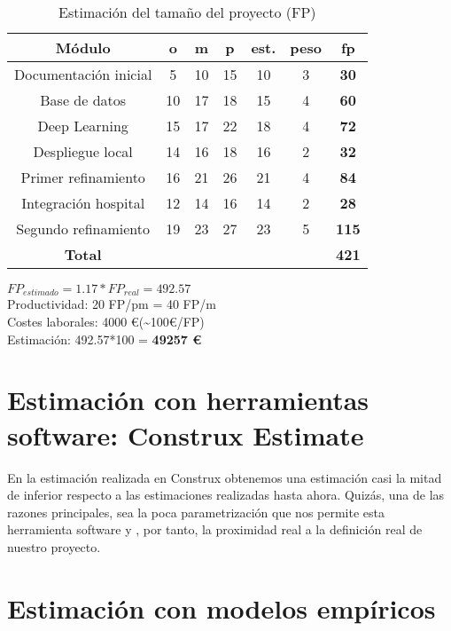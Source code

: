 \begin{table}[H]
	\begin{center}
		\begin{tabular}{|c||c|c|c|c|c|c|}
			\hline 
			Módulo & o & m & p & est. & peso & \textbf{fp} \\
			\hline \hline
			Documentación inicial & 5 & 10 & 15 & 10 & 3 & \textbf{30}  \\ \hline
			Base de datos & 10 & 17 & 18 & 15 & 4 & \textbf{60}  \\ \hline
			Deep Learning & 15 & 17 & 22 & 18 & 4 & \textbf{72}  \\ \hline
			Despliegue local & 14 & 16 & 18 & 16 & 2 & \textbf{32}  \\ \hline
			Primer refinamiento & 16 & 21 & 26 & 21 & 4 & \textbf{84}  \\ \hline
			Integración hospital & 12 & 14 & 16 & 14 & 2 & \textbf{28}  \\ \hline
			Segundo refinamiento & 19 & 23 & 27 & 23 & 5 & \textbf{115}  \\ \hline
			\textbf{Total} & & & & & & \textbf{421}  \\ \hline
		\end{tabular}
		\caption{Estimación del tamaño del proyecto (FP)}
		\label{tabla:FP}
	\end{center}
\end{table}


$FP_{estimado} = 1.17 * FP_{real} = 492.57$ \\
Productividad: 20 FP/pm = 40 FP/m \\
Costes laborales: 4000 \euro (\textasciitilde{}100\euro/FP) \\
Estimación: 492.57*100 = \textbf{49257 \euro} 

\section{Estimación con herramientas software: Construx Estimate}


En la estimación realizada en Construx obtenemos una estimación casi la mitad de inferior respecto a las estimaciones realizadas hasta ahora. Quizás, una de las razones principales, sea la poca parametrización que nos permite esta herramienta software y , por tanto, la proximidad real a la definición real de nuestro proyecto.

\section{Estimación con modelos empíricos}

